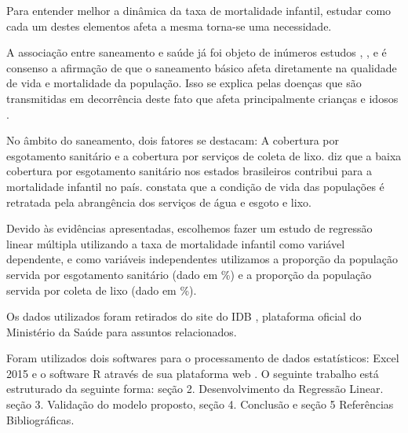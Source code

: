 Para entender melhor a dinâmica da taxa de mortalidade infantil, estudar como cada um destes elementos
afeta a mesma torna-se uma necessidade.

A associação entre saneamento e saúde já foi objeto de inúmeros estudos \cite{libanio2005dimensao},
\cite{teixeira2011analise}, \cite{costa2002indicadores} e é consenso a afirmação de que o saneamento
básico afeta diretamente na qualidade de vida e mortalidade da população. Isso se explica pelas doenças
que são transmitidas em decorrência deste fato que afeta principalmente crianças e idosos
\cite{libanio2005dimensao}.

No âmbito do saneamento, dois fatores se destacam: A cobertura por esgotamento sanitário e a cobertura
por serviços de coleta de lixo. \cite{teixeira2011analise} diz que a baixa cobertura por esgotamento sanitário
nos estados brasileiros contribui para a mortalidade infantil no país. \cite{libanio2005dimensao} constata que a condição de vida das
populações é retratada pela abrangência dos serviços de água e esgoto e lixo.

Devido às evidências apresentadas, escolhemos fazer um estudo de regressão linear múltipla utilizando a
taxa de mortalidade infantil como variável dependente, e como variáveis independentes utilizamos a proporção
da população servida por esgotamento sanitário (dado em \%) e a proporção da população servida por coleta de
lixo (dado em \%).

Os dados utilizados foram retirados do site do IDB \cite{idb}, plataforma oficial do Ministério da Saúde para
assuntos relacionados.

Foram utilizados dois softwares para o processamento de dados estatísticos: Excel 2015 e o software R
através de sua plataforma web \cite{wessa}. O seguinte trabalho está estruturado da seguinte forma: seção 2.
Desenvolvimento da Regressão Linear. seção 3. Validação do modelo proposto, seção 4. Conclusão e seção 5
Referências Bibliográficas.
